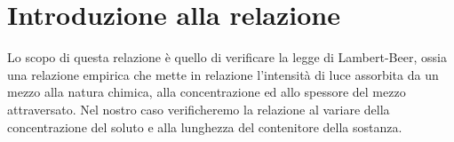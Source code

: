\section{Introduzione alla relazione}

Lo scopo di questa relazione è quello di verificare la legge di Lambert-Beer, ossia una relazione empirica che mette in relazione l'intensità di luce assorbita da un mezzo alla natura chimica, alla concentrazione ed allo spessore del mezzo attraversato.
Nel nostro caso verificheremo la relazione al variare della concentrazione del soluto e alla lunghezza del contenitore della sostanza.

